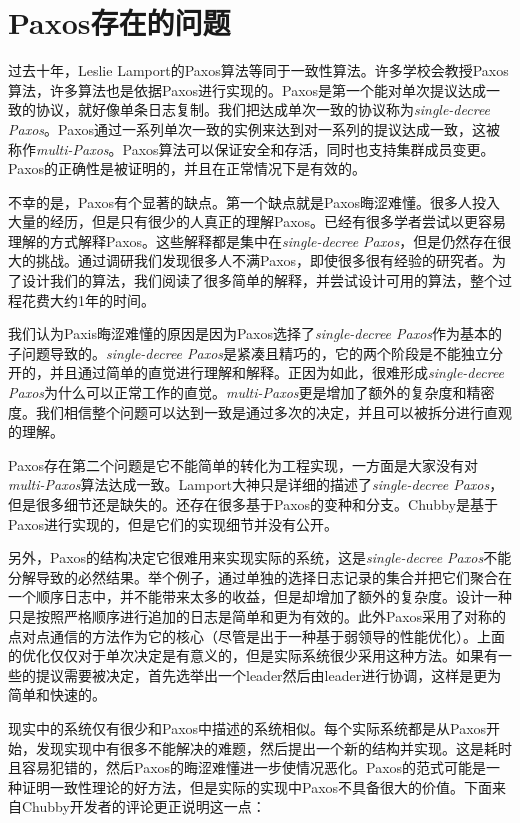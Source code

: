 \documentclass[journal]{IEEEtran}
\begin{document}
\section{Paxos存在的问题}
过去十年，Leslie Lamport的Paxos算法等同于一致性算法。许多学校会教授Paxos算法，许多算法也是依据Paxos进行实现的。Paxos是第一个能对单次提议达成一致的协议，就好像单条日志复制。我们把达成单次一致的协议称为\textit{single-decree Paxos}。Paxos通过一系列单次一致的实例来达到对一系列的提议达成一致，这被称作\textit{multi-Paxos}。Paxos算法可以保证安全和存活，同时也支持集群成员变更。Paxos的正确性是被证明的，并且在正常情况下是有效的。


不幸的是，Paxos有个显著的缺点。第一个缺点就是Paxos晦涩难懂。很多人投入大量的经历，但是只有很少的人真正的理解Paxos。已经有很多学者尝试以更容易理解的方式解释Paxos。这些解释都是集中在\textit{single-decree Paxos}，但是仍然存在很大的挑战。通过调研我们发现很多人不满Paxos，即使很多很有经验的研究者。为了设计我们的算法，我们阅读了很多简单的解释，并尝试设计可用的算法，整个过程花费大约1年的时间。


我们认为Paxis晦涩难懂的原因是因为Paxos选择了\textit{single-decree Paxos}作为基本的子问题导致的。\textit{single-decree Paxos}是紧凑且精巧的，它的两个阶段是不能独立分开的，并且通过简单的直觉进行理解和解释。正因为如此，很难形成\textit{single-decree Paxos}为什么可以正常工作的直觉。\textit{multi-Paxos}更是增加了额外的复杂度和精密度。我们相信整个问题可以达到一致是通过多次的决定，并且可以被拆分进行直观的理解。


Paxos存在第二个问题是它不能简单的转化为工程实现，一方面是大家没有对\textit{multi-Paxos}算法达成一致。Lamport大神只是详细的描述了\textit{single-decree Paxos}，但是很多细节还是缺失的。还存在很多基于Paxos的变种和分支。Chubby是基于Paxos进行实现的，但是它们的实现细节并没有公开。


另外，Paxos的结构决定它很难用来实现实际的系统，这是\textit{single-decree Paxos}不能分解导致的必然结果。举个例子，通过单独的选择日志记录的集合并把它们聚合在一个顺序日志中，并不能带来太多的收益，但是却增加了额外的复杂度。设计一种只是按照严格顺序进行追加的日志是简单和更为有效的。此外Paxos采用了对称的点对点通信的方法作为它的核心（尽管是出于一种基于弱领导的性能优化）。上面的优化仅仅对于单次决定是有意义的，但是实际系统很少采用这种方法。如果有一些的提议需要被决定，首先选举出一个leader然后由leader进行协调，这样是更为简单和快速的。


现实中的系统仅有很少和Paxos中描述的系统相似。每个实际系统都是从Paxos开始，发现实现中有很多不能解决的难题，然后提出一个新的结构并实现。这是耗时且容易犯错的，然后Paxos的晦涩难懂进一步使情况恶化。Paxos的范式可能是一种证明一致性理论的好方法，但是实际的实现中Paxos不具备很大的价值。下面来自Chubby开发者的评论更正说明这一点：
\end{document}
